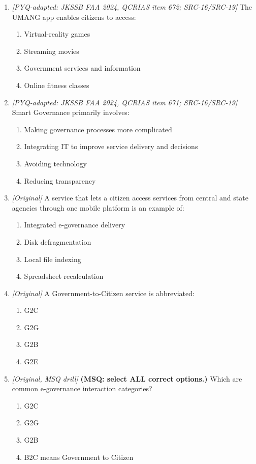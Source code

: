 \begin{enumerate}[label=\textbf{Q\arabic*.}, leftmargin=*]
\begin{enumerate}[label=\Alph*.]
    \item UPI is a paper money-order form.
  \end{enumerate}
\item \textit{[PYQ-adapted: JKSSB FAA 2024, QCRIAS item 672; SRC-16/SRC-19]} The UMANG app enables citizens to access:
  \begin{enumerate}[label=\Alph*.]
\item Virtual-reality games
   \item Streaming movies
   \item Government services and information
   \item Online fitness classes
  \end{enumerate}

\item \textit{[PYQ-adapted: JKSSB FAA 2024, QCRIAS item 671; SRC-16/SRC-19]} Smart Governance primarily involves:
  \begin{enumerate}[label=\Alph*.]
\item Making governance processes more complicated
   \item Integrating IT to improve service delivery and decisions
   \item Avoiding technology
   \item Reducing transparency
  \end{enumerate}

\item \textit{[Original]} A service that lets a citizen access services from central and state agencies through one mobile platform is an example of:
  \begin{enumerate}[label=\Alph*.]
\item Integrated e-governance delivery
   \item Disk defragmentation
   \item Local file indexing
   \item Spreadsheet recalculation
  \end{enumerate}

\item \textit{[Original]} A Government-to-Citizen service is abbreviated:
  \begin{enumerate}[label=\Alph*.]
\item G2C
   \item G2G
   \item G2B
   \item G2E
  \end{enumerate}

\item \textit{[Original, MSQ drill]} \textbf{(MSQ: select ALL correct options.)} Which are common e-governance interaction categories?
  \begin{enumerate}[label=\Alph*.]
\item G2C
   \item G2G
   \item G2B
   \item B2C means Government to Citizen
  \end{enumerate}

\end{enumerate}
